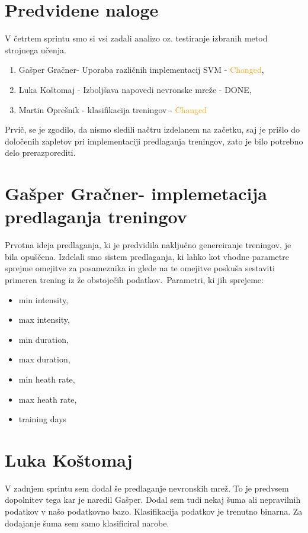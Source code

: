 \documentclass[a4paper,11pt]{article}
\begin{document}
\section{Predvidene naloge}
V četrtem sprintu smo si vsi zadali analizo oz. testiranje izbranih metod strojnega učenja.
	\begin{enumerate}
		\item{Gašper Gračner- Uporaba različnih implementacij SVM - \textcolor{Orange}{Changed}, }
		\item{Luka Koštomaj - Izboljšava napovedi nevronske mreže - \textcolor{OliveGreen}{DONE}, }
		\item{Martin Oprešnik - klasifikacija treningov - \textcolor{Orange}{Changed}}
	\end{enumerate}
Prvič, se je zgodilo, da nismo sledili načtru izdelanem na začetku, saj je prišlo do določenih zapletov pri implementaciji predlaganja treningov, zato je bilo potrebno delo prerazporediti.
	

\newpage
\section{Gašper Gračner- implemetacija predlaganja treningov}
Prvotna ideja predlaganja, ki je predvidila naključno genereiranje treningov, je bila opuščena. Izdelali smo sistem predlaganja, ki lahko kot vhodne parametre sprejme omejitve za posameznika in glede na te omejitve poskuša sestaviti primeren trening iz že obstoječih podatkov.\
Parametri, ki jih sprejeme:
\begin{itemize}
	\item{min intensity,}
	\item{max intensity,}
	\item{min duration,}
	\item{max duration,}
	\item{min heath rate,}
	\item{max heath rate,}
	\item{training days}
\end{itemize}

\section{Luka Koštomaj}
V zadnjem sprintu sem dodal še predlaganje nevronskih mrež. To je predvsem dopolnitev tega kar je naredil Gašper. Dodal sem tudi nekaj šuma ali nepravilnih podatkov v našo podatkovno bazo. Klasifikacija podatkov je trenutno binarna. Za dodajanje šuma sem samo klasificiral narobe.
\end{document}
